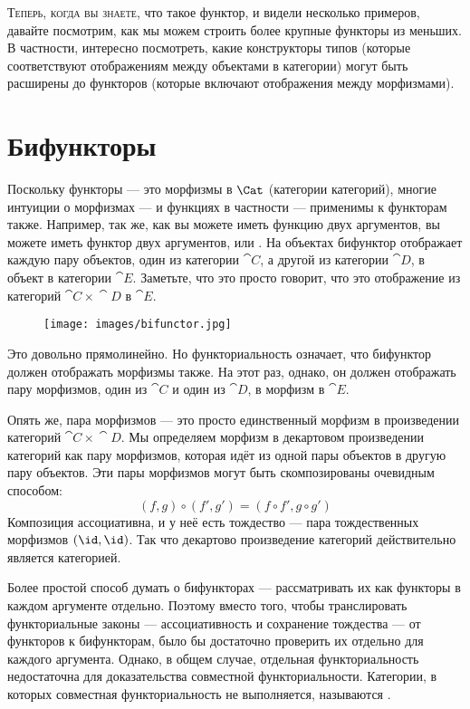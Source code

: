 
\lettrine[lhang=0.17]{Т}{еперь, когда вы знаете}, что такое функтор, и видели несколько примеров, давайте
посмотрим, как мы можем строить более крупные функторы из меньших. В частности,
интересно посмотреть, какие конструкторы типов (которые соответствуют
отображениям между объектами в категории) могут быть расширены до функторов
(которые включают отображения между морфизмами).

\section{Бифункторы}

Поскольку функторы --- это морфизмы в $\Cat$ (категории категорий),
многие интуиции о морфизмах --- и функциях в частности ---
применимы к функторам также. Например, так же, как вы можете иметь
функцию двух аргументов, вы можете иметь функтор двух аргументов, или
. На объектах бифунктор отображает каждую пару объектов,
один из категории $\cat{C}$, а другой из категории $\cat{D}$, в объект в категории
$\cat{E}$. Заметьте, что это просто говорит, что это отображение из
 категорий $\cat{C}\times{}\cat{D}$ в $\cat{E}$.

\begin{figure}[H]
  \centering\texttt{[image: images/bifunctor.jpg]}
\end{figure}

\noindent
Это довольно прямолинейно. Но функториальность означает, что бифунктор
должен отображать морфизмы также. На этот раз, однако, он должен отображать пару
морфизмов, один из $\cat{C}$ и один из $\cat{D}$, в морфизм в $\cat{E}$.

Опять же, пара морфизмов --- это просто единственный морфизм в произведении
категорий $\cat{C}\times{}\cat{D}$. Мы определяем морфизм в декартовом произведении категорий
как пару морфизмов, которая идёт из одной пары объектов в другую
пару объектов. Эти пары морфизмов могут быть скомпозированы очевидным
способом:
\[(f, g) \circ (f', g') = (f \circ f', g \circ g')\]
Композиция ассоциативна, и у неё есть тождество --- пара
тождественных морфизмов $(\id, \id)$. Так что декартово произведение категорий
действительно является категорией.

Более простой способ думать о бифункторах --- рассматривать их как функторы в
каждом аргументе отдельно. Поэтому вместо того, чтобы транслировать функториальные законы ---
ассоциативность и сохранение тождества --- от функторов к бифункторам,
было бы достаточно проверить их отдельно для каждого аргумента. Однако, в общем случае,
отдельная функториальность недостаточна для доказательства совместной функториальности. Категории, в которых
совместная функториальность не выполняется, называются .

